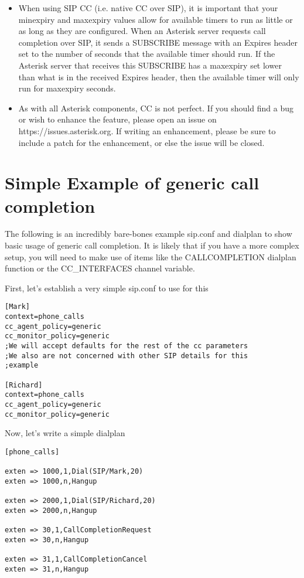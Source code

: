\begin{itemize}
\item When using SIP CC (i.e. native CC over SIP), it is important that
your minexpiry and maxexpiry values allow for available timers to run
as little or as long as they are configured. When an Asterisk server
requests call completion over SIP, it sends a SUBSCRIBE message with
an Expires header set to the number of seconds that the available
timer should run. If the Asterisk server that receives this SUBSCRIBE
has a maxexpiry set lower than what is in the received Expires header,
then the available timer will only run for maxexpiry seconds.

\item As with all Asterisk components, CC is not perfect. If you should
find a bug or wish to enhance the feature, please open an issue on
https://issues.asterisk.org. If writing an enhancement, please be sure
to include a patch for the enhancement, or else the issue will be
closed.

\end{itemize}

\section{Simple Example of generic call completion}

The following is an incredibly bare-bones example sip.conf
and dialplan to show basic usage of generic call completion.
It is likely that if you have a more complex setup, you will
need to make use of items like the CALLCOMPLETION dialplan
function or the CC\_INTERFACES channel variable.

First, let's establish a very simple sip.conf to use for this

\begin{verbatim}
[Mark]
context=phone_calls
cc_agent_policy=generic
cc_monitor_policy=generic
;We will accept defaults for the rest of the cc parameters
;We also are not concerned with other SIP details for this
;example

[Richard]
context=phone_calls
cc_agent_policy=generic
cc_monitor_policy=generic
\end{verbatim}

Now, let's write a simple dialplan

\begin{verbatim}
[phone_calls]

exten => 1000,1,Dial(SIP/Mark,20)
exten => 1000,n,Hangup

exten => 2000,1,Dial(SIP/Richard,20)
exten => 2000,n,Hangup

exten => 30,1,CallCompletionRequest
exten => 30,n,Hangup

exten => 31,1,CallCompletionCancel
exten => 31,n,Hangup
\end{verbatim}

